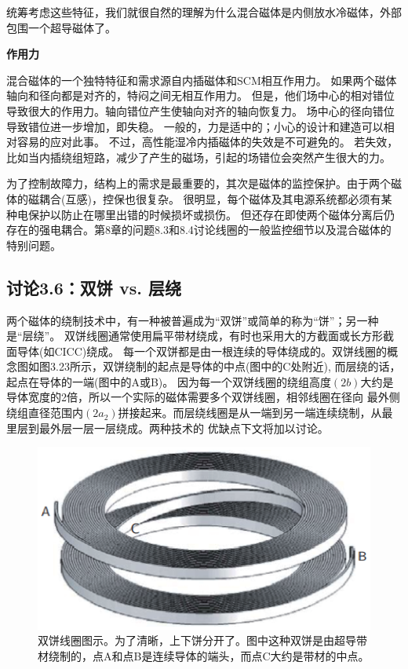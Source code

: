 统筹考虑这些特征，我们就很自然的理解为什么混合磁体是内侧放水冷磁体，外部包围一个超导磁体了。

\textbf{作用力}

混合磁体的一个独特特征和需求源自内插磁体和SCM相互作用力。
如果两个磁体轴向和径向都是对齐的，特闷之间无相互作用力。
但是，他们场中心的相对错位导致很大的作用力。轴向错位产生使轴向对齐的轴向恢复力。
场中心的径向错位导致错位进一步增加，即失稳。
一般的，力是适中的；小心的设计和建造可以相对容易的应对此事。
不过，高性能湿冷内插磁体的失效是不可避免的。
若失效，比如当内插绕组短路，减少了产生的磁场，引起的场错位会突然产生很大的力。

为了控制故障力，结构上的需求是最重要的，其次是磁体的监控保护。由于两个磁体的磁耦合(互感)，控保也很复杂。
很明显，每个磁体及其电源系统都必须有某种电保护以防止在哪里出错的时候损坏或损伤。
但还存在即使两个磁体分离后仍存在的强电耦合。第8章的问题8.3和8.4讨论线圈的一般监控细节以及混合磁体的特别问题。
\newpage

\subsection{讨论3.6：双饼 vs. 层绕}
两个磁体的绕制技术中，有一种被普遍成为“双饼”或简单的称为“饼”；另一种是“层绕”。
双饼线圈通常使用扁平带材绕成，有时也采用大的方截面或长方形截面导体(如CICC)绕成。
每一个双饼都是由一根连续的导体绕成的。双饼线圈的概念图如图3.23所示，双饼绕制的起点是导体的中点(图中的C处附近),
而层绕的话，起点在导体的一端(图中的A或B)。
因为每一个双饼线圈的绕组高度$(2b)$大约是导体宽度的2倍，所以一个实际的磁体需要多个双饼线圈，相邻线圈在径向
最外侧绕组直径范围内$(2a_2)$拼接起来。而层绕线圈是从一端到另一端连续绕制，从最里层到最外层一层一层绕成。两种技术的
优缺点下文将加以讨论。

\begin{figure}[htbp]
	\centering
	\includegraphics[scale=0.6]{chpt3/figs/fig3.23.eps}
	\caption{双饼线圈图示。为了清晰，上下饼分开了。图中这种双饼是由超导带材绕制的，点A和点B是连续导体的端头，而点C大约是带材的中点。}
\end{figure}

